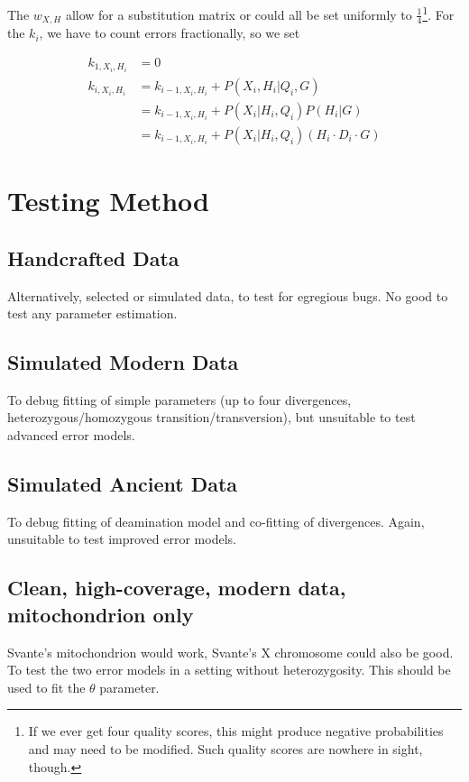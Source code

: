 \documentclass{article}
\begin{document}
The $w_{X,H}$ allow for a substitution matrix or could all be set uniformly to $\frac{1}{4}$\footnote{If we ever get four quality
scores, this might produce negative probabilities and may need to be modified.  Such quality scores are nowhere in sight, though.}.  For the $k_i$, we have to count
errors fractionally, so we set

\begin{align*}
k_{1,X_i,H_i} &= 0 \\
k_{i,X_i,H_i} &= k_{i-1,X_i,H_i} + P(X_i, H_i | Q_i, G) \\
&= k_{i-1,X_i,H_i} + P(X_i | H_i, Q_i) P(H_i | G) \\
&= k_{i-1,X_i,H_i} + P(X_i | H_i, Q_i) \left( H_i \cdot D_i \cdot G \right)
\end{align*}

\section{Testing Method}

\subsection{Handcrafted Data}

Alternatively, selected or simulated data, to test for egregious bugs.
No good to test any parameter estimation.

\subsection{Simulated Modern Data}

To debug fitting of simple parameters (up to four divergences,
heterozygous/homozygous transition/transversion), but unsuitable to test
advanced error models.

\subsection{Simulated Ancient Data}

To debug fitting of deamination model and co-fitting of divergences.
Again, unsuitable to test improved error models.

\subsection{Clean, high-coverage, modern data, mitochondrion only}

Svante's mitochondrion would work, Svante's X chromosome could also be
good.  To test the two error models in a setting without heterozygosity.
This should be used to fit the $\theta$ parameter.
\end{document}
